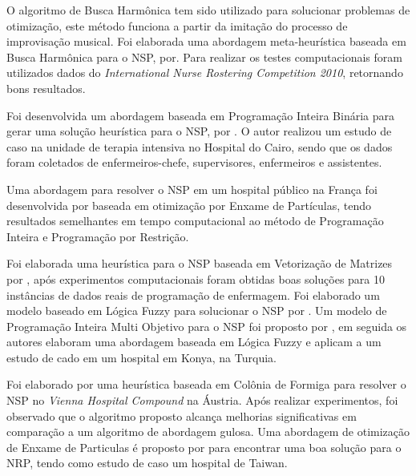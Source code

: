 
O algoritmo de Busca Harmônica  tem sido utilizado para solucionar problemas de otimização, este método funciona a partir da imitação do processo de improvisação musical.  Foi elaborada uma abordagem meta-heurística baseada em Busca Harmônica para o \ac{NSP}, por\cite{awadallah:2011}. Para realizar os testes computacionais foram utilizados dados do \textit{ International Nurse Rostering Competition 2010}, retornando bons resultados.

Foi desenvolvida um abordagem baseada em Programação Inteira Binária para gerar uma solução heurística para o \ac{NSP}, por \cite{Zen-El-Din:2012}. O autor realizou um estudo de caso  na unidade de terapia intensiva no Hospital do Cairo, sendo que os dados foram coletados de enfermeiros-chefe, supervisores, enfermeiros e assistentes.

Uma abordagem para resolver o \ac{NSP} em um hospital público na França foi desenvolvida por \cite{altamirano:2010} baseada em otimização por Enxame de Partículas, tendo resultados semelhantes em tempo computacional ao método de Programação Inteira e Programação por Restrição.

Foi elaborada uma heurística para o \ac{NSP} baseada em Vetorização de Matrizes por \cite{yindong:2008}, após experimentos computacionais foram obtidas boas soluções para 10 instâncias de dados reais de programação de enfermagem. 
Foi elaborado um modelo baseado em Lógica Fuzzy para solucionar o \ac{NSP} por \cite{topaloglu:2010}.
Um modelo de Programação Inteira Multi Objetivo para o \ac{NSP} foi proposto por \cite{cetin:2015}, em seguida os autores elaboram uma abordagem baseada em Lógica Fuzzy e aplicam a um estudo de cado em um hospital em Konya, na Turquia.

Foi elaborado por \cite{gutjahra:2007} uma heurística baseada em Colônia de Formiga para resolver o \ac{NSP} no \textit{Vienna Hospital Compound} na Áustria. Após realizar experimentos, foi observado que o algoritmo proposto alcança melhorias significativas em comparação a um algoritmo de abordagem gulosa.
Uma abordagem de otimização de Enxame de Particulas é proposto por \cite{wu:2015} para encontrar uma boa solução para o \ac{NRP}, tendo como estudo de caso um hospital de Taiwan. 

